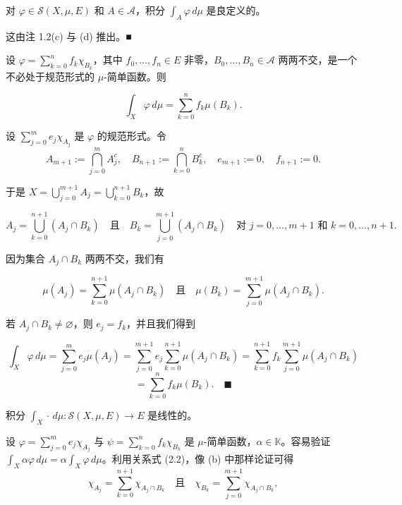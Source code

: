 \begin{remark}

\begin{items}
\item

对 $ \varphi \in \mathcal{S}(X,\mu,E) $ 和 $ A \in \mathcal{A} $，积分 $ \int_A \varphi \, d\mu $ 是良定义的。

\proofhead
这由注 1.2(c) 与 (d) 推出。\nobreak\hspace{0.35em}■
\end{items}

\begin{items}
\item[（b）]

设 $ \varphi = \sum_{k=0}^{n} f_k \chi_{B_k} $，其中 $ f_0, \ldots, f_n \in E $ 非零，$ B_0, \ldots, B_n \in \mathcal{A} $ 两两不交，是一个不必处于规范形式的 $ \mu $-简单函数。则

\[
\int_X \varphi \, d\mu = \sum_{k=0}^{n} f_k \mu(B_k) .
\]

\proofhead
设 $ \sum_{j=0}^{m} e_j \chi_{A_j} $ 是 $ \varphi $ 的规范形式。令
\begin{equation}
A_{m+1} := \bigcap_{j=0}^{m} A_j^{c} , \quad B_{n+1} := \bigcap_{k=0}^{n} B_k^{c} , \quad e_{m+1} := 0 , \quad f_{n+1} := 0 .\tag{2.2}
\end{equation}

于是 $ X = \bigcup_{j=0}^{m+1} A_j = \bigcup_{k=0}^{n+1} B_k $，故

\[
A_j = \bigcup_{k=0}^{n+1} (A_j \cap B_k) \quad \text{且} \quad B_k = \bigcup_{j=0}^{m+1} (A_j \cap B_k) \quad \text{对 } j = 0, \ldots, m+1 \text{ 和 } k = 0, \ldots, n+1 .
\]

因为集合 $ A_j \cap B_k $ 两两不交，我们有

\[
\mu(A_j) = \sum_{k=0}^{n+1} \mu(A_j \cap B_k) \quad \text{且} \quad \mu(B_k) = \sum_{j=0}^{m+1} \mu(A_j \cap B_k) .
\]

若 $ A_j \cap B_k \ne \varnothing $，则 $ e_j = f_k $，并且我们得到

\[
\int_X \varphi \, d\mu = \sum_{j=0}^{m} e_j \mu(A_j) = \sum_{j=0}^{m+1} e_j \sum_{k=0}^{n+1} \mu(A_j \cap B_k) = \sum_{k=0}^{n+1} f_k \sum_{j=0}^{m+1} \mu(A_j \cap B_k)
\]
\[
= \sum_{k=0}^{n} f_k \mu(B_k) .\quad\blacksquare
\]
\item[（c）]

积分 $ \int_X \cdot \, d\mu : \mathcal{S}(X,\mu,E) \to E $ 是线性的。

\proofhead
设 $ \varphi = \sum_{j=0}^{m} e_j \chi_{A_j} $ 与 $ \psi = \sum_{k=0}^{n} f_k \chi_{B_k} $ 是 $ \mu $-简单函数，$ \alpha \in \mathbb{K} $。容易验证 $ \int_X \alpha \varphi \, d\mu = \alpha \int_X \varphi \, d\mu $。利用关系式 (2.2)，像 (b) 中那样论证可得
\[
\chi_{A_j} = \sum_{k=0}^{n+1} \chi_{A_j \cap B_k} \quad \text{且} \quad \chi_{B_k} = \sum_{j=0}^{m+1} \chi_{A_j \cap B_k} ,
\]


\end{items}
\end{remark}
